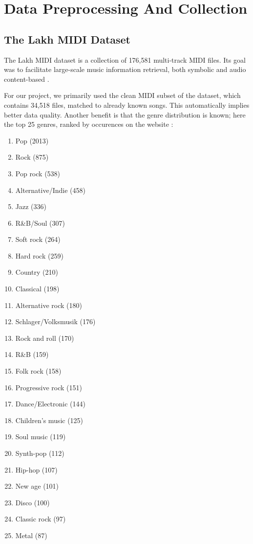 \documentclass[a4paper,12pt]{extarticle}
\begin{document}
\section{Data Preprocessing And Collection}
\subsection{The Lakh MIDI Dataset}
The Lakh MIDI dataset is a collection of 176,581 multi-track MIDI files. Its goal was to facilitate large-scale music information retrieval, both symbolic and audio content-based \parencite{Raffel2016LearningBasedMF}.\newline

\raggedright For our project, we primarily used the clean MIDI subset of the dataset, which contains 34,518 files, matched to already known songs. This automatically implies better data quality. Another benefit is that the genre distribution is known; here the top 25 genres, ranked by occurences on the website \textcite{GenreDistr}:
\vspace{0.1cm}
\begin{multicols}{3}
\begin{enumerate}
    \item Pop (2013)
    \item Rock (875)
    \item Pop rock (538)
    \item Alternative/Indie (458)
    \item Jazz (336)
    \item R\&B/Soul (307)
    \item Soft rock (264)
    \item Hard rock (259)
    \item Country (210)
    \item Classical (198)
    \item Alternative rock (180)
    \item Schlager/Volksmusik (176)
    \item Rock and roll (170)
    \item R\&B (159)
    \item Folk rock (158)
    \item Progressive rock (151)
    \item Dance/Electronic (144)
    \item Children's music (125)
    \item Soul music (119)
    \item Synth-pop (112)
    \item Hip-hop (107)
    \item New age (101)
    \item Disco (100)
    \item Classic rock (97)
    \item Metal (87)
\end{enumerate}
\end{multicols}
\end{document}
